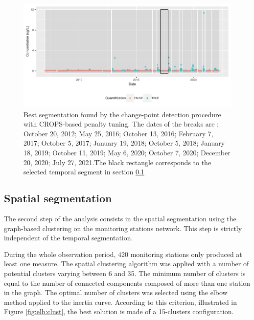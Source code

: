 \begin{figure}[htbp]
  \centering
  \includegraphics[]{figs/Chap5/Seg_opt.pdf}
  \caption{Best segmentation found by the change-point detection procedure with CROPS-based penalty tuning. The dates of the breaks are : October 20, 2012; May 25, 2016; October 13, 2016; February 7, 2017; October 5, 2017; January 19, 2018; October 5, 2018; January 18, 2019; October 11, 2019; May 6, 2020; October 7, 2020; December 20, 2020; July 27, 2021.The black rectangle corresponds to the selected temporal segment in section \ref{section:clust129}}\label{fig:seg}
\end{figure}


\subsection{Spatial segmentation}\label{section:clust129}

The second step of the analysis consists in the spatial segmentation using the graph-based clustering on the monitoring stations network. This step is strictly independent of the temporal segmentation. 


During the whole observation period, 420 monitoring stations only produced at least one measure. The spatial clustering algorithm was applied with a number of potential clusters varying between 6 and 35. The minimum number of clusters is equal to the number of connected components composed of more than one station in the graph. The optimal number of clusters was selected using the elbow method applied to the inertia curve. According to this criterion, illustrated in Figure \ref{fig:elb:clust}, the best solution is made of a 15-clusters configuration. 

